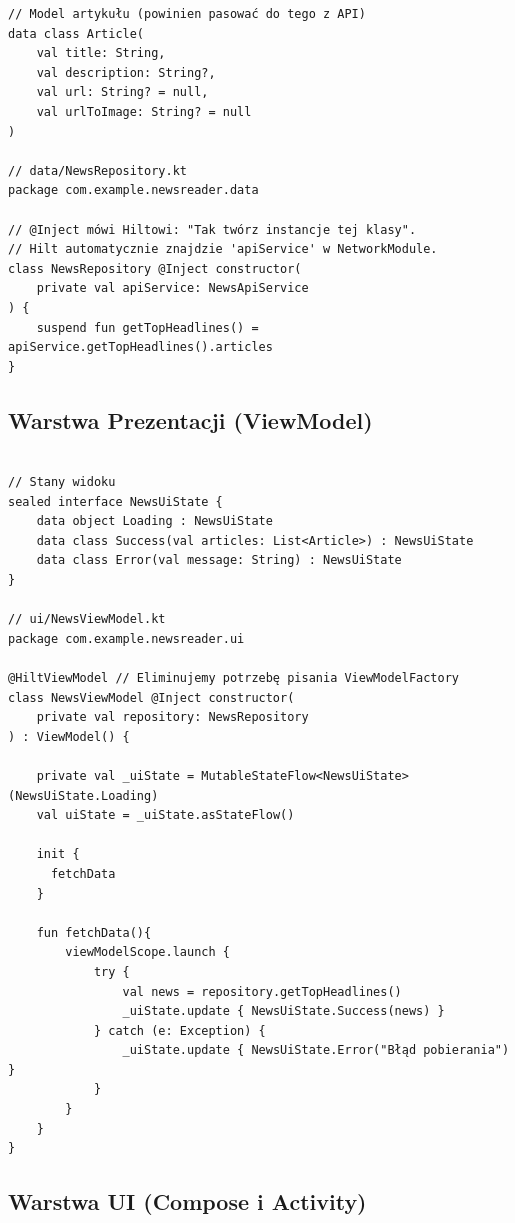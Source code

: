 \begin{verbatim}
// Model artykułu (powinien pasować do tego z API)
data class Article(
    val title: String,
    val description: String?,
    val url: String? = null,
    val urlToImage: String? = null
)

// data/NewsRepository.kt
package com.example.newsreader.data

// @Inject mówi Hiltowi: "Tak twórz instancje tej klasy".
// Hilt automatycznie znajdzie 'apiService' w NetworkModule.
class NewsRepository @Inject constructor(
    private val apiService: NewsApiService
) {
    suspend fun getTopHeadlines() = apiService.getTopHeadlines().articles
}
\end{verbatim}

\subsection{Warstwa Prezentacji (ViewModel)}

\begin{verbatim}

// Stany widoku
sealed interface NewsUiState {
    data object Loading : NewsUiState
    data class Success(val articles: List<Article>) : NewsUiState
    data class Error(val message: String) : NewsUiState
}

// ui/NewsViewModel.kt
package com.example.newsreader.ui

@HiltViewModel // Eliminujemy potrzebę pisania ViewModelFactory
class NewsViewModel @Inject constructor(
    private val repository: NewsRepository
) : ViewModel() {

    private val _uiState = MutableStateFlow<NewsUiState>(NewsUiState.Loading)
    val uiState = _uiState.asStateFlow()

    init {
      fetchData
    }

    fun fetchData(){
        viewModelScope.launch {
            try {
                val news = repository.getTopHeadlines()
                _uiState.update { NewsUiState.Success(news) }
            } catch (e: Exception) {
                _uiState.update { NewsUiState.Error("Błąd pobierania") }
            }
        }
    }
}
\end{verbatim}

\subsection{Warstwa UI (Compose i Activity)}

